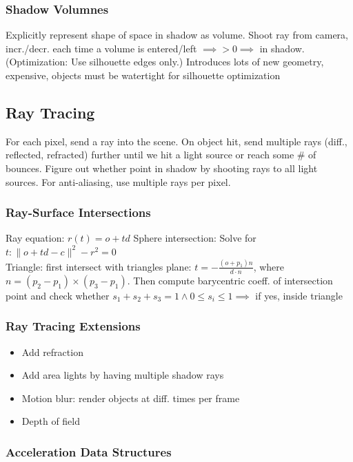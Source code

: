\documentclass[a4paper,10pt]{article}
\begin{document}
\subsubsection{Shadow Volumnes} Explicitly represent shape of space in shadow as volume. Shoot ray from camera, incr./decr. each time a volume is entered/left \( \implies > 0 \implies \) in shadow. (Optimization: Use silhouette edges only.) Introduces lots of new geometry, expensive, objects must be watertight for silhouette optimization

\subsection{Ray Tracing}
For each pixel, send a ray into the scene. On object hit, send multiple rays (diff., reflected, refracted) further until we hit a light source or reach some \# of bounces. Figure out whether point in shadow by shooting rays to all light sources. For anti-aliasing, use multiple rays per pixel.

\subsubsection{Ray-Surface Intersections} Ray equation: \( r(t) = o + td \)
Sphere intersection: Solve for \( t: \lVert o + td - c \rVert ^2 - r^2 = 0 \) \\
Triangle: first intersect with triangles plane: \( t = -\frac{(o+p_{1})n}{d\cdot n} \), where \( n = (p_{2}-p_{1})\times(p_{3}-p_{1}) \).
Then compute barycentric coeff. of intersection point and check whether \( s_{1}+s_{2}+s_{3} = 1 \land 0 \le s_i \le 1 \implies \) if yes, inside triangle

\subsubsection{Ray Tracing Extensions}
\begin{itemize}
    \item Add refraction
    \item Add area lights by having multiple shadow rays
    \item Motion blur: render objects at diff. times per frame
    \item Depth of field
\end{itemize}

\subsubsection{Acceleration Data Structures}
\smallskip
\end{document}
